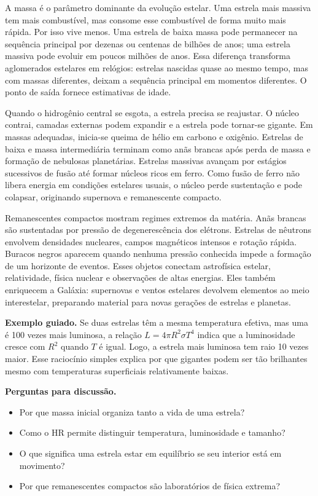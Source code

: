 \documentclass[11pt,a4paper]{article}
\begin{document}
A massa é o parâmetro dominante da evolução estelar. Uma estrela mais massiva tem mais combustível, mas consome esse combustível de forma muito mais rápida. Por isso vive menos. Uma estrela de baixa massa pode permanecer na sequência principal por dezenas ou centenas de bilhões de anos; uma estrela massiva pode evoluir em poucos milhões de anos. Essa diferença transforma aglomerados estelares em relógios: estrelas nascidas quase ao mesmo tempo, mas com massas diferentes, deixam a sequência principal em momentos diferentes. O ponto de saída fornece estimativas de idade.

Quando o hidrogênio central se esgota, a estrela precisa se reajustar. O núcleo contrai, camadas externas podem expandir e a estrela pode tornar-se gigante. Em massas adequadas, inicia-se queima de hélio em carbono e oxigênio. Estrelas de baixa e massa intermediária terminam como anãs brancas após perda de massa e formação de nebulosas planetárias. Estrelas massivas avançam por estágios sucessivos de fusão até formar núcleos ricos em ferro. Como fusão de ferro não libera energia em condições estelares usuais, o núcleo perde sustentação e pode colapsar, originando supernova e remanescente compacto.

Remanescentes compactos mostram regimes extremos da matéria. Anãs brancas são sustentadas por pressão de degenerescência dos elétrons. Estrelas de nêutrons envolvem densidades nucleares, campos magnéticos intensos e rotação rápida. Buracos negros aparecem quando nenhuma pressão conhecida impede a formação de um horizonte de eventos. Esses objetos conectam astrofísica estelar, relatividade, física nuclear e observações de altas energias. Eles também enriquecem a Galáxia: supernovas e ventos estelares devolvem elementos ao meio interestelar, preparando material para novas gerações de estrelas e planetas.

\textbf{Exemplo guiado.} Se duas estrelas têm a mesma temperatura efetiva, mas uma é 100 vezes mais luminosa, a relação $L=4\pi R^2\sigma T^4$ indica que a luminosidade cresce com $R^2$ quando $T$ é igual. Logo, a estrela mais luminosa tem raio 10 vezes maior. Esse raciocínio simples explica por que gigantes podem ser tão brilhantes mesmo com temperaturas superficiais relativamente baixas.

\textbf{Perguntas para discussão.}
\begin{itemize}
\item Por que massa inicial organiza tanto a vida de uma estrela?
\item Como o HR permite distinguir temperatura, luminosidade e tamanho?
\item O que significa uma estrela estar em equilíbrio se seu interior está em movimento?
\item Por que remanescentes compactos são laboratórios de física extrema?
\end{itemize}
\end{document}
